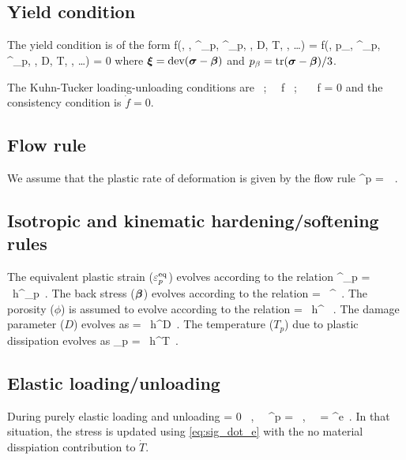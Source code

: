 \subsection{Yield condition}
The yield condition is of the form
\Beq
  f(\Bsig, \Bbeta, \Veps^\Teq_p, \dot{\Veps}^\Teq_p, \phi, D, T, \Edot{\Teq}, \dots) =
  f(\Bxi, p_\beta, \Veps^\Teq_p, \dot{\Veps}^\Teq_p, \phi, D, T, \Edot{\Teq}, \dots) = 0
\Eeq
where $\boldsymbol{\xi} = \text{dev}(\boldsymbol{\sigma} - \boldsymbol{\beta})$ and $p_\beta = \text{tr}(\boldsymbol{\sigma} - \boldsymbol{\beta})/3$. 

The Kuhn-Tucker loading-unloading conditions are
\Beq
  \dot{\lambda}  ~;~~  f  ~;~~ \dot{\lambda}~f = 0
\Eeq
and the consistency condition is $\dot{f} = 0$.

\subsection{Flow rule}
We assume that the plastic rate of deformation is given by the flow rule
\Beq
  \dot{\BVeps}^p = \dot{\lambda}~\BM \,.
\Eeq

\subsection{Isotropic and kinematic hardening/softening rules}
The equivalent plastic strain ($\varepsilon_p^{\text{eq}}$) evolves according to the relation
\Beq
  \dot{\Veps}^\Teq_p = \dot{\lambda}~h^{\Veps_p} \,.
\Eeq
The back stress ($\boldsymbol{\beta}$) evolves according to the relation
\Beq
  \dot{\Bbeta} = \dot{\lambda}~\Bh^{\beta} \,.
\Eeq
The porosity ($\phi$) is assumed to evolve according to the relation
\Beq
  \dot{\phi} = \dot{\lambda}~h^{\phi} ~.
\Eeq
The damage parameter ($D$) evolves as
\Beq
   = \dot{\lambda}~h^D \,.
\Eeq
The temperature ($T_p$) due to plastic dissipation evolves as
\Beq
  _p = \dot{\lambda}~h^T \,.
\Eeq

\subsection{Elastic loading/unloading}
During purely elastic loading and unloading
\Beq
  \dot{\lambda} = 0 ~,~~ \dot{\BVeps}^p = \Bzero ~,~~ \dot{\BVeps} = \dot{\BVeps}^e \,.
\Eeq
In that situation, the stress is updated using \eqref{eq:sig_dot_e} with the no material
disspiation contribution to $\dot{T}$.

